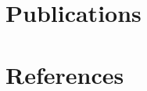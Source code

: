 %
%







\clearpage
\section*{Publications}
\vspace{-0.5\baselineskip}


\clearpage
\section*{References}


\label{LastPage}


